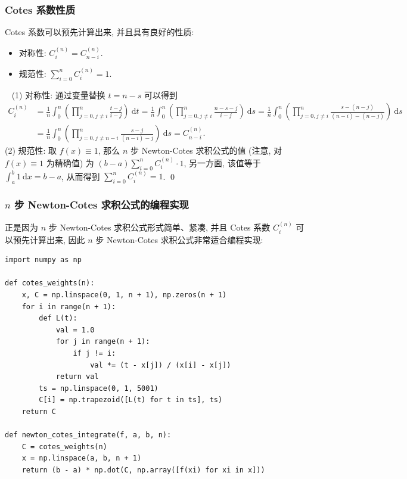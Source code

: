 \begin{frame}
\frametitle{Cotes 系数性质}

Cotes 系数可以预先计算出来, 并且具有良好的性质:

\begin{prop}
\begin{itemize}
\item 对称性: $C_i^{(n)} = C_{n-i}^{(n)}$.
\item 规范性: $\sum_{i=0}^n C_i^{(n)} = 1$.
\end{itemize}
\end{prop}

\pause

\startproof[bg=yellow, fg=red] ~
(1) 对称性: 通过变量替换 $t = n - s$ 可以得到
\begin{align*}
C_i^{(n)} & = \frac{1}{n} \int_0^n \left(\prod_{j=0, j \neq i}^n \frac{t - j}{i - j} \right) ~ \mathrm{d}t = \frac{1}{n} \int_0^n \left(\prod_{j=0, j \neq i}^n \frac{n - s - j}{i - j} \right) ~ \mathrm{d}s = \frac{1}{n} \int_0^n \left(\prod_{j=0, j \neq i}^n \frac{s - (n-j)}{(n-i) - (n-j)} \right) ~ \mathrm{d}s \\
& = \frac{1}{n} \int_0^n \left(\prod_{j=0, j \neq n-i}^n \frac{s - j}{(n-i) - j} \right) ~ \mathrm{d}s = C_{n-i}^{(n)}.
\end{align*}
\pause
(2) 规范性: 取 $f(x) \equiv 1$, 那么 $n$ 步 Newton-Cotes 求积公式的值 (注意, 对 $f(x) \equiv 1$ 为精确值) 为 $(b-a) \sum_{i=0}^n C_i^{(n)} \cdot 1$, 另一方面, 该值等于 $\int_a^b 1 ~ \mathrm{d}x = b - a$, 从而得到 $\sum_{i=0}^n C_i^{(n)} = 1$.
\qed

\end{frame}


\begin{frame}[fragile]
\frametitle{$n$ 步 Newton-Cotes 求积公式的编程实现}

正是因为 $n$ 步 Newton-Cotes 求积公式形式简单、紧凑, 并且 Cotes 系数 $C_i^{(n)}$ 可以预先计算出来, 因此 $n$ 步 Newton-Cotes 求积公式非常适合编程实现:

\begin{lstlisting}
import numpy as np

def cotes_weights(n):
    x, C = np.linspace(0, 1, n + 1), np.zeros(n + 1)
    for i in range(n + 1):
        def L(t):
            val = 1.0
            for j in range(n + 1):
                if j != i:
                    val *= (t - x[j]) / (x[i] - x[j])
            return val
        ts = np.linspace(0, 1, 5001)
        C[i] = np.trapezoid([L(t) for t in ts], ts)
    return C

def newton_cotes_integrate(f, a, b, n):
    C = cotes_weights(n)
    x = np.linspace(a, b, n + 1)
    return (b - a) * np.dot(C, np.array([f(xi) for xi in x]))
\end{lstlisting}

\end{frame}

